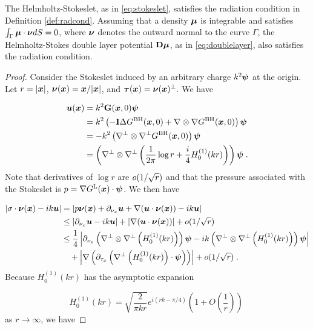 \begin{proposition}
The Helmholtz-Stokeslet, as in \eqref{eq:stokeslet}, satisfies
the radiation condition in Definition \ref{def:radcond}.
Assuming that a density ${\boldsymbol \mu}$ is integrable and satisfies
$\int_\Gamma {\boldsymbol \mu}\cdot {\boldsymbol \nu} dS = 0$, where ${\boldsymbol \nu}$ denotes the
outward normal to the curve $\Gamma$, the Helmholtz-Stokes
double layer potential ${\bf D}{\boldsymbol \mu}$, as in \eqref{eq:doublelayer},
also satisfies the radiation condition.
\end{proposition}

\begin{proof}
Consider the Stokeslet induced by an arbitrary charge
$k^2 {\boldsymbol \psi}$ at the origin. Let $r = |{\boldsymbol x}|$,
${\boldsymbol \nu}({\boldsymbol x}) = {\boldsymbol x}/|{\boldsymbol x}|$, and ${\boldsymbol \tau}({\boldsymbol x}) = {\boldsymbol \nu}({\boldsymbol x})^\perp$. We have

\begin{align}
{\boldsymbol u} ({\boldsymbol x}) &= k^2 {\bf G}({\boldsymbol x},0) {\boldsymbol \psi} \\
&= k^2 \left (-{\bf I} \Delta G^{\textrm{BH}}({\boldsymbol x},0)
+ \nabla \otimes \nabla G^{\textrm{BH}}({\boldsymbol x},0)\right ) {\boldsymbol \psi} \\
&= -k^2 \left (\nabla^\perp \otimes \nabla^\perp G^{\textrm{BH}}({\boldsymbol x},0) \right) {\boldsymbol \psi} \\
&= \left(\nabla^\perp \otimes \nabla^\perp \left ( \frac{1}{2\pi}
\log r + \frac{i}{4} H_0^{(1)} (kr) \right ) \right){\boldsymbol \psi} \; .
\end{align}
Note that derivatives of $\log r$ are $o (1/\sqrt{r})$
and that the pressure associated with the Stokeslet is
$p = \nabla G^{\textrm{L}}({\boldsymbol x}) \cdot {\boldsymbol \psi}$. We then have

\begin{align}
\left | \sigma \cdot {\boldsymbol \nu}({\boldsymbol x}) - i k {\boldsymbol u} \right | &=
\left | p {\boldsymbol \nu}({\boldsymbol x}) + \partial_{{\nu_x}} {\boldsymbol u} + \nabla ({\boldsymbol u} \cdot {\boldsymbol \nu}({\boldsymbol x}))
- ik {\boldsymbol u} \right | \\
&\leq \left | \partial_{{\nu_x}} {\boldsymbol u} - ik{\boldsymbol u} \right | + \left | \nabla({\boldsymbol u} \cdot {\boldsymbol \nu}({\boldsymbol x})) \right |
+ o (1/\sqrt{r}) \\
&\leq \frac{1}{4} \left | \partial_{{\nu_x}} \left(\nabla^\perp \otimes
\nabla^\perp \left (H_0^{(1)} (kr) \right ) \right){\boldsymbol \psi}
- i k \left(\nabla^\perp \otimes \nabla^\perp
\left (H_0^{(1)} (kr) \right ) \right){\boldsymbol \psi} \right | \\
& \quad + \left | \nabla \left( \partial_{\tau_x} \left ( 
\nabla^\perp \left (H_0^{(1)} (kr) \right ) \cdot {\boldsymbol \psi}  \right )
\right) \right | + o (1/\sqrt{r}) \; .
\end{align}
Because $H_0^{(1)}(kr)$ has the asymptotic expansion 

\begin{equation}
H_0^{(1)}(kr) = \sqrt{\frac{2}{\pi k r}} e^{i(rk-\pi/4)} \left ( 1 + O\left (
\frac{1}{r} \right ) \right ) \;
\end{equation}
as $r\to \infty$, we have


\end{proof}
